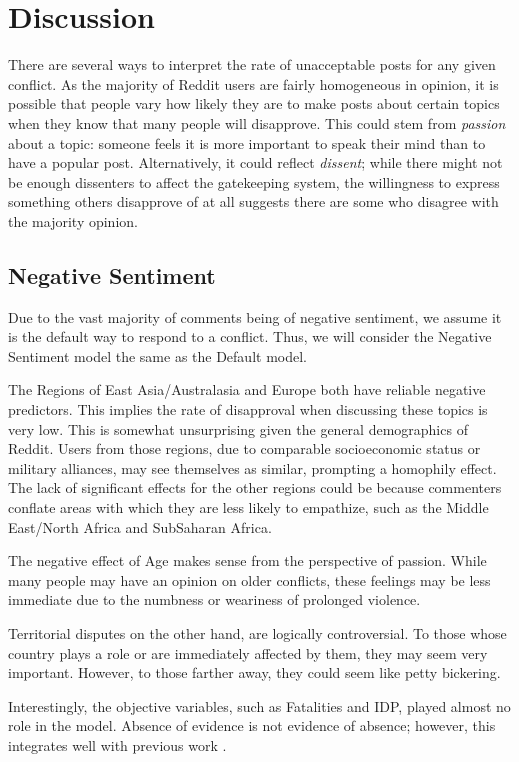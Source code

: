 \section{Discussion}
There are several ways to interpret the rate of unacceptable posts for any given conflict. As the majority of Reddit users are fairly homogeneous in opinion, it is possible that people vary how likely they are to make posts about certain topics when they know that many people will disapprove. This could stem from \textit{passion} about a topic: someone feels it is more important to speak their mind than to have a popular post. Alternatively, it could reflect \textit{dissent}; while there might not be enough dissenters to affect the gatekeeping system, the willingness to express something others disapprove of at all suggests there are some who disagree with the majority opinion. 

\subsection{Negative Sentiment}
Due to the vast majority of comments being of negative sentiment, we assume it is the default way to respond to a conflict. Thus, we will consider the Negative Sentiment model the same as the Default model.

The Regions of East Asia/Australasia and Europe both have reliable negative predictors. This implies the rate of disapproval when discussing these topics is very low. This is somewhat unsurprising given the general demographics of Reddit. Users from those regions, due to comparable socioeconomic status or military alliances, may see themselves as similar, prompting a homophily effect. The lack of significant effects for the other regions could be because commenters conflate areas with which they are less likely to empathize, such as the Middle East/North Africa and SubSaharan Africa.

The negative effect of Age makes sense from the perspective of passion. While many people may have an opinion on older conflicts, these feelings may be less immediate due to the numbness or weariness of prolonged violence.

Territorial disputes on the other hand, are logically controversial. To those whose country plays a role or are immediately affected by them, they may seem very important. However, to those farther away, they could seem like petty bickering.

Interestingly, the objective variables, such as Fatalities and IDP, played almost no role in the model. Absence of evidence is not evidence of absence; however, this integrates well with previous work \cite{Berinsky2009}.

